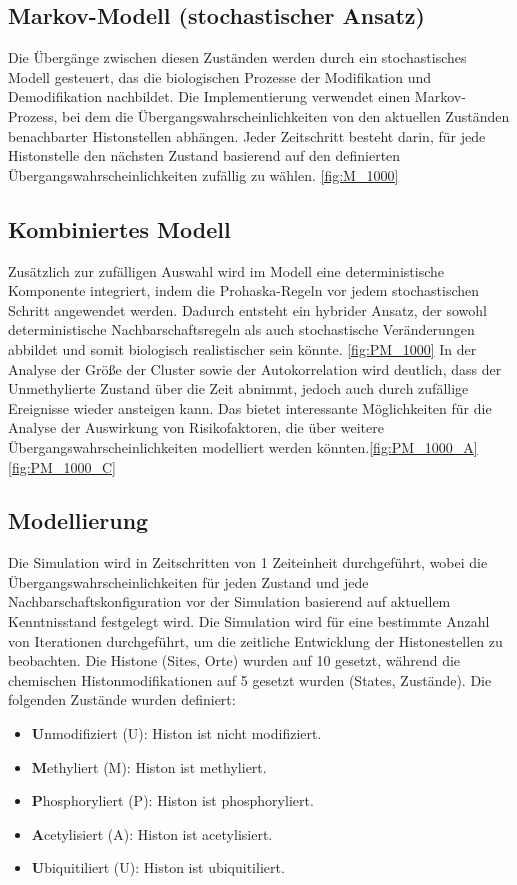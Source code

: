 \documentclass{SeminarV2}
\begin{document}
\subsection{Markov-Modell (stochastischer Ansatz)}
Die \"{U}berg\"{a}nge zwischen diesen Zust\"{a}nden 
werden durch ein stochastisches Modell gesteuert, das die 
biologischen Prozesse der Modifikation und Demodifikation nachbildet. 
Die Implementierung verwendet einen Markov-Prozess, bei dem die 
\"{U}bergangswahrscheinlichkeiten von den aktuellen Zust\"{a}nden benachbarter Histonstellen abh\"{a}ngen.
Jeder Zeitschritt besteht darin, für jede Histonstelle den nächsten Zustand basierend auf den definierten Übergangswahrscheinlichkeiten zufällig zu wählen. \ref{fig:M_1000}

\subsection{Kombiniertes Modell}
Zusätzlich zur zufälligen Auswahl wird im Modell eine deterministische Komponente integriert, indem die Prohaska-Regeln vor jedem stochastischen Schritt angewendet werden. Dadurch entsteht ein hybrider Ansatz, der sowohl deterministische Nachbarschaftsregeln als auch stochastische Veränderungen abbildet und somit biologisch realistischer sein könnte.
\ref{fig:PM_1000}
In der Analyse der Größe der Cluster sowie der Autokorrelation wird deutlich, dass der Unmethylierte Zustand über die Zeit abnimmt, jedoch auch durch zufällige Ereignisse wieder ansteigen kann.
Das bietet interessante Möglichkeiten für die Analyse der Auswirkung von Risikofaktoren, die über weitere Übergangswahrscheinlichkeiten modelliert werden könnten.\ref{fig:PM_1000_A}\ref{fig:PM_1000_C}

\subsection{Modellierung}
Die Simulation wird in Zeitschritten von 1 Zeiteinheit durchgef\"{u}hrt, wobei die \"{U}bergangswahrscheinlichkeiten f\"{u}r jeden Zustand und jede Nachbarschaftskonfiguration 
vor der Simulation basierend auf aktuellem Kenntnisstand festgelegt wird.
Die Simulation wird f\"{u}r eine bestimmte Anzahl von Iterationen durchgef\"{u}hrt, um die zeitliche Entwicklung der Histonestellen zu beobachten.
Die Histone (Sites, Orte) wurden auf 10 gesetzt, während die chemischen Histonmodifikationen auf 5 gesetzt wurden (States, Zustände).
Die folgenden Zust\"{a}nde wurden definiert:
\begin{itemize}
  \item \textbf{U}nmodifiziert (U): Histon ist nicht modifiziert.
  \item \textbf{M}ethyliert (M): Histon ist methyliert.
  \item \textbf{P}hosphoryliert (P): Histon ist phosphoryliert.
  \item \textbf{A}cetylisiert (A): Histon ist acetylisiert.
  \item \textbf{U}biquitiliert (U): Histon ist ubiquitiliert.
\end{itemize}
\end{document}
